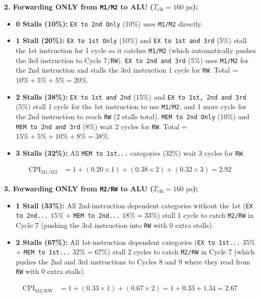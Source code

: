 \documentclass[11pt, a4paper]{article}
\begin{document}
\textbf{2. Forwarding ONLY from \texttt{M1/M2} to ALU ($T_{\text{clk}} = 160\text{ ps}$):}
\begin{itemize}[noitemsep, topsep=2pt]
    \item \textbf{0 Stalls (10\%):} \texttt{EX to 2nd Only} (10\%) uses \texttt{M1/M2} directly.
    \item \textbf{1 Stall (20\%):} \texttt{EX to 1st Only} (10\%) and \texttt{EX to 1st and 3rd} (5\%) stall the 1st instruction for 1 cycle so it catches \texttt{M1/M2} (which automatically pushes the 3rd instruction to Cycle 7/\texttt{RW}). \texttt{EX to 2nd and 3rd} (5\%) uses \texttt{M1/M2} for the 2nd instruction and stalls the 3rd instruction 1 cycle for \texttt{RW}. Total = $10\% + 5\% + 5\% = 20\%$.
    \item \textbf{2 Stalls (38\%):} \texttt{EX to 1st and 2nd} (15\%) and \texttt{EX to 1st, 2nd and 3rd} (5\%) stall 1 cycle for the 1st instruction to use \texttt{M1/M2}, and 1 more cycle for the 2nd instruction to reach \texttt{RW} (2 stalls total). \texttt{MEM to 2nd Only} (10\%) and \texttt{MEM to 2nd and 3rd} (8\%) wait 2 cycles for \texttt{RW}. Total = $15\% + 5\% + 10\% + 8\% = 38\%$.
    \item \textbf{3 Stalls (32\%):} All \texttt{MEM to 1st...} categories (32\%) wait 3 cycles for \texttt{RW}.
\end{itemize}
\begin{align*}
    \text{CPI}_{\text{M1/M2}} &= 1 + (0.20 \times 1) + (0.38 \times 2) + (0.32 \times 3) = \mathbf{2.92}
\end{align*}

\textbf{3. Forwarding ONLY from \texttt{M2/RW} to ALU ($T_{\text{clk}} = 160\text{ ps}$):}
\begin{itemize}[noitemsep, topsep=2pt]
    \item \textbf{1 Stall (33\%):} All 2nd-instruction dependent categories without the 1st (\texttt{EX to 2nd...} $15\%$ + \texttt{MEM to 2nd...} $18\% = 33\%$) stall 1 cycle to catch \texttt{M2/RW} in Cycle 7 (pushing the 3rd instruction into \texttt{RW} with 0 extra stalls).
    \item \textbf{2 Stalls (67\%):} All 1st-instruction dependent categories (\texttt{EX to 1st...} $35\%$ + \texttt{MEM to 1st...} $32\% = 67\%$) stall 2 cycles to catch \texttt{M2/RW} in Cycle 7 (which pushes the 2nd and 3rd instructions to Cycles 8 and 9 where they read from \texttt{RW} with 0 extra stalls).
\end{itemize}
\begin{align*}
    \text{CPI}_{\text{M2/RW}} &= 1 + (0.33 \times 1) + (0.67 \times 2) = 1 + 0.33 + 1.34 = \mathbf{2.67}
\end{align*}
\end{document}
